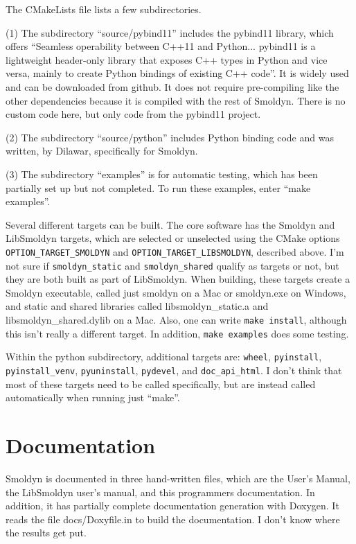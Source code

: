 \documentclass {book}
\begin{document}
The CMakeLists file lists a few subdirectories.

(1) The subdirectory ``source/pybind11'' includes the pybind11 library, which offers ``Seamless operability between C++11 and Python... pybind11 is a lightweight header-only library that exposes C++ types in Python and vice versa, mainly to create Python bindings of existing C++ code''. It is widely used and can be downloaded from github. It does not require pre-compiling like the other dependencies because it is compiled with the rest of Smoldyn. There is no custom code here, but only code from the pybind11 project.

(2) The subdirectory ``source/python'' includes Python binding code and was written, by Dilawar, specifically for Smoldyn.

(3) The subdirectory ``examples'' is for automatic testing, which has been partially set up but not completed. To run these examples, enter ``make examples''.

Several different targets can be built. The core software has the Smoldyn and LibSmoldyn targets, which are selected or unselected using the CMake options \texttt{OPTION\_TARGET\_SMOLDYN} and \texttt{OPTION\_TARGET\_LIBSMOLDYN}, described above. I'm not sure if \texttt{smoldyn\_static} and \texttt{smoldyn\_shared} qualify as targets or not, but they are both built as part of LibSmoldyn. When building, these targets create a Smoldyn executable, called just smoldyn on a Mac or smoldyn.exe on Windows, and static and shared libraries called libsmoldyn\_static.a and libsmoldyn\_shared.dylib on a Mac. Also, one can write \texttt{make install}, although this isn't really a different target. In addition, \texttt{make examples} does some testing.

Within the python subdirectory, additional targets are: \texttt{wheel}, \texttt{pyinstall}, \texttt{pyinstall\_venv}, \texttt{pyuninstall}, \texttt{pydevel}, and \texttt{doc\_api\_html}. I don't think that most of these targets need to be called specifically, but are instead called automatically when running just ``make''.

\section{Documentation}

Smoldyn is documented in three hand-written files, which are the User's Manual, the LibSmoldyn user's manual, and this programmers documentation. In addition, it has partially complete documentation generation with Doxygen. It reads the file docs/Doxyfile.in to build the documentation. I don't know where the results get put.
\end{document}
